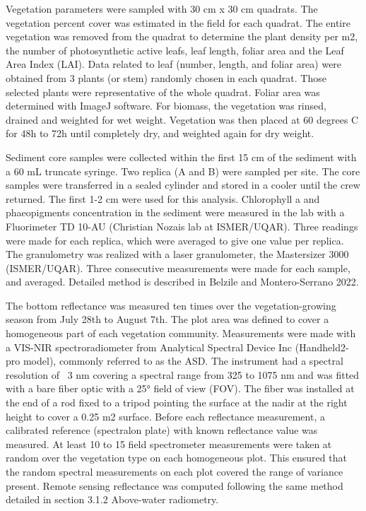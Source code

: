 \documentclass[essd, manuscript]{copernicus}
\begin{document}
Vegetation parameters were sampled with 30 cm x 30 cm quadrats. The vegetation percent cover was estimated in the field for each quadrat. The entire vegetation was removed from the quadrat to determine the plant density per m2, the number of photosynthetic active leafs, leaf length, foliar area and the Leaf Area Index (LAI). Data related to leaf (number, length, and foliar area) were obtained from 3 plants (or stem) randomly chosen in each quadrat. Those selected plants were representative of the whole quadrat. Foliar area was determined with ImageJ software. For biomass, the vegetation was rinsed, drained and weighted for wet weight. Vegetation was then placed at 60 degrees C for 48h to 72h until completely dry, and weighted again for dry weight.

Sediment core samples were collected within the first 15 cm of the sediment with a 60 mL truncate syringe. Two replica (A and B) were sampled per site. The core samples were transferred in a sealed cylinder and stored in a cooler until the crew returned. The first 1-2 cm were used for this analysis. Chlorophyll a and phaeopigments concentration in the sediment were measured in the lab with a Fluorimeter TD 10-AU (Christian Nozais lab at ISMER/UQAR). Three readings were made for each replica, which were averaged to give one value per replica.
The granulometry was realized with a laser granulometer, the Mastersizer 3000 (ISMER/UQAR). Three consecutive measurements were made for each sample, and averaged. Detailed method is described in Belzile and Montero-Serrano 2022.

The bottom reflectance was measured ten times over the vegetation-growing season from July 28th  to August 7th.  The plot area was defined to cover a homogeneous part of each vegetation community. Measurements were made with a VIS-NIR spectroradiometer from Analytical Spectral Device Inc (Handheld2-pro model), commonly referred to as the ASD. The instrument had a spectral resolution of ~3 nm covering a spectral range from 325 to 1075 nm and was fitted with a bare fiber optic with a 25° field of view (FOV). The fiber was installed at the end of a rod fixed to a tripod pointing the surface at the nadir at the right height to cover a 0.25 m2 surface. Before each reflectance measurement, a calibrated reference (spectralon plate) with known reflectance value was measured. At least 10 to 15 field spectrometer measurements were taken at random over the vegetation type on each homogeneous plot. This ensured that the random spectral measurements on each plot covered the range of variance present. Remote sensing reflectance was computed following the same method detailed in section 3.1.2 Above-water radiometry.
\end{document}
